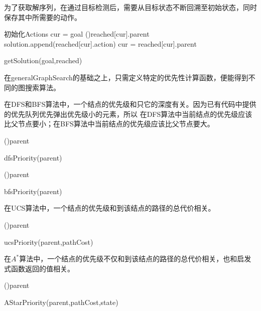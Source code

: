 为了获取解序列，在通过目标检测后，需要从目标状态不断回溯至初始状态，同时保存其中所需要的动作。

\begin{procedure}
    初始化Actions\;
    cur = goal\;
    \While(){reached[cur].parent}
    {
        solution.append(reached[cur].action)\;
        cur = reached[cur].parent\;
    }
    \caption{getSolution(goal,reached)}
\end{procedure}

在generalGraphSearch的基础之上，只需定义特定的优先性计算函数，便能得到不同的图搜索算法。

在DFS和BFS算法中，一个结点的优先级和只它的深度有关。因为已有代码中提供的优先队列优先弹出优先级小的元素，所以
在DFS算法中当前结点的优先级应该比父节点要小；在BFS算法中当前结点的优先级应该比父节点要大。

\begin{function}[H]
    \lIf(){\not parent}{}
    \caption{dfsPriority(parent)}
\end{function}

\begin{function}[H]
    \lIf(){\not parent}{}
    \caption{bfsPriority(parent)}
\end{function}

在UCS算法中，一个结点的优先级和到该结点的路径的总代价相关。

\begin{function}[H]
    \lIf(){\not parent}{}
    \caption{ucsPriority(parent,pathCost)}
\end{function}

在$A^*$算法中，一个结点的优先级不仅和到该结点的路径的总代价相关，也和启发式函数返回的值相关。

\begin{function}[H]
    \lIf(){\not parent}{}
    \caption{AStarPriority(parent,pathCost,state)}
\end{function}

